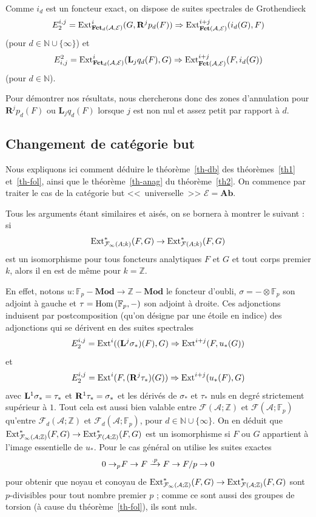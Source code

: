 \documentclass[a4paper,10pt]{article}
\newcommand{\A}{{\mathcal{A}}}
\newcommand{\F}{{\mathcal{F}}}
\newcommand{\fct}{\mathbf{Fct}}
\newcommand{\E}{{\mathcal{E}}}
\newcommand{\Pol}{\fct}
\theoremstyle{definition}
\theoremstyle{remark}
\begin{document}
\smallskip

Comme $i_d$ est un foncteur exact, on dispose de suites spectrales de Grothendieck
\begin{equation}\label{gr1}
 E_2^{i,j}={\rm Ext}^i_{\Pol_d(\A,\E)}(G,\mathbf{R}^j p_d(F))\Rightarrow {\rm Ext}^{i+j}_{\fct(\A,\E)}(i_d(G),F)
\end{equation}
(pour $d\in\mathbb{N}\cup\{\infty\}$) et
\begin{equation}\label{gr2}
E^2_{i,j}={\rm Ext}^i_{\Pol_d(\A,\E)}(\mathbf{L}_j q_d(F),G)\Rightarrow {\rm Ext}^{i+j}_{\fct(\A,\E)}(F,i_d(G))
\end{equation}
(pour $d\in\mathbb{N}$).

Pour démontrer nos résultats, nous chercherons donc des zones d'annulation pour $\mathbf{R}^j p_d(F)$ ou $\mathbf{L}_j q_d(F)$ lorsque $j$ est non nul et assez petit par rapport à $d$.

\subsection{Changement de catégorie but}

Nous expliquons ici comment déduire le théorème~\ref{th-db} des théorèmes~\ref{th1} et~\ref{th-fol}, ainsi que le théorème~\ref{th-anag} du théorème~\ref{th2}. On commence par traiter le cas de la catégorie but <<~universelle~>> $\E=\mathbf{Ab}$.

Tous les arguments étant similaires et aisés, on se bornera à montrer le suivant :
si
$${\rm Ext}^*_{\F_\infty(A;k)}(F,G)\to {\rm Ext}^*_{\F(A;k)}(F,G)$$
est un isomorphisme pour tous foncteurs analytiques $F$ et $G$ et tout corps premier $k$, alors il en est de même pour $k=\mathbb{Z}$.

En effet, notons $u : \mathbb{F}_p-\mathbf{Mod}\to\mathbb{Z}-\mathbf{Mod}$ le foncteur d'oubli, $\sigma=-\otimes\mathbb{F}_p$ son adjoint à gauche et $\tau={\rm Hom}\,(\mathbb{F}_p,-)$ son adjoint à droite. Ces adjonctions induisent par postcomposition (qu'on désigne par une étoile en indice) des adjonctions qui se dérivent en des suites spectrales
$$E_2^{i,j}={\rm Ext}^i(({\bf L}^j\sigma_*)(F),G)\Rightarrow {\rm Ext}^{i+j}(F,u_*(G))$$
et
$$E_2^{i,j}={\rm Ext}^i(F,({\bf R}^j\tau_*)(G))\Rightarrow {\rm Ext}^{i+j}(u_*(F),G)$$
avec ${\bf L}^1\sigma_*=\tau_*$ et ${\bf R}^1\tau_*=\sigma_*$ et les dérivés de $\sigma_*$ et $\tau_*$ nuls en degré strictement supérieur à $1$. Tout cela est aussi bien valable entre $\F(\A;\mathbb{Z})$ et $\F(\A;\mathbb{F}_p)$ qu'entre $\F_d(\A;\mathbb{Z})$ et $\F_d(\A;\mathbb{F}_p)$, pour $d\in\mathbb{N}\cup\{\infty\}$. On en déduit que ${\rm Ext}^*_{\F_\infty(\A;\mathbb{Z})}(F,G)\to {\rm Ext}^*_{\F(\A;\mathbb{Z})}(F,G)$ est un isomorphisme si $F$ ou $G$ appartient à l'image essentielle de $u_*$. Pour le cas général on utilise les suites exactes
$$0\to_p\negmedspace F\to F\xrightarrow{.p}F\to F/p\to 0$$
pour obtenir que noyau et conoyau de ${\rm Ext}^*_{\F_\infty(\A;\mathbb{Z})}(F,G)\to {\rm Ext}^*_{\F(\A;\mathbb{Z})}(F,G)$ sont $p$-divisibles pour tout nombre premier $p$ ; comme ce sont aussi des groupes de torsion (à cause du théorème~\ref{th-fol}), ils sont nuls.
\end{document}

